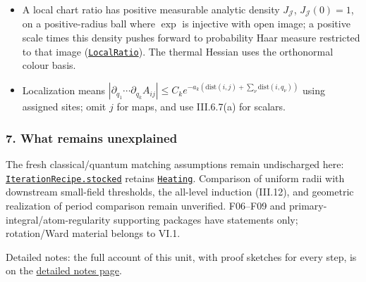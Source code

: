 \documentclass[
  letterpaper,
  11pt]{article}
\begin{document}
\begin{itemize}
  Here \(r_{ij}\) sums row-\(i\) coefficients of plaquette type \(j\).
  ``Funded'' further specifies root-kernel rows on fixed coordinate
  paths, level bounds and weighted cubic/quartic caps
  (\href{https://github.com/yang-mills-group/OpenAI-YM-20261028/blob/3456e5e75cf8d4cd558955a5c7638fba2d68f464/YM/Extra/ITERATION_NO_LOSS/Gates.lean\#L35-L39}{\texttt{Work\ item}}).
\item
  A local chart ratio has positive measurable analytic density
  \(J_{\mathscr J}\), \(J_{\mathscr J}(0)=1\), on a positive-radius ball
  where \(\exp\) is injective with open image; a positive scale times
  this density pushes forward to probability Haar measure restricted to
  that image
  (\href{https://github.com/yang-mills-group/OpenAI-YM-20261028/blob/3456e5e75cf8d4cd558955a5c7638fba2d68f464/YM/PCalc/Loop.lean\#L28-L38}{\texttt{LocalRatio}}).
  The thermal Hessian uses the orthonormal colour basis.
\item
  Localization means
  \(|\partial_{q_1}\cdots\partial_{q_k}A_{ij}|\le C_ke^{-a_k(\mathrm{dist}(i,j)+\sum_\nu\mathrm{dist}(i,q_\nu))}\)
  using assigned sites; omit \(j\) for maps, and use III.6.7(a) for
  scalars.
\end{itemize}

\subsubsection{7. What remains
unexplained}\label{what-remains-unexplained-8}

The fresh classical/quantum matching assumptions remain undischarged
here:
\href{https://github.com/yang-mills-group/OpenAI-YM-20261028/blob/3456e5e75cf8d4cd558955a5c7638fba2d68f464/YM/Further/ITERATION_RECIPE_PRODUCER/Crown.lean\#L102-L112}{\texttt{IterationRecipe.stocked}}
retains
\href{https://github.com/yang-mills-group/OpenAI-YM-20261028/blob/3456e5e75cf8d4cd558955a5c7638fba2d68f464/YM/Further/ITERATION_RECIPE_PRODUCER/Crown.lean\#L83-L97}{\texttt{Heating}}.
Comparison of uniform radii with downstream small-field thresholds, the
all-level induction (III.12), and geometric realization of period
comparison remain unverified. F06--F09 and
primary-integral/atom-regularity supporting packages have statements
only; rotation/Ward material belongs to VI.1.

Detailed notes: the full account of this unit, with proof sketches for
every step, is on the
\href{https://github.com/scottnarmstrong/yang-mills-informalization/blob/main/outline/notes/III-6.md}{detailed
notes page}.
\end{document}
